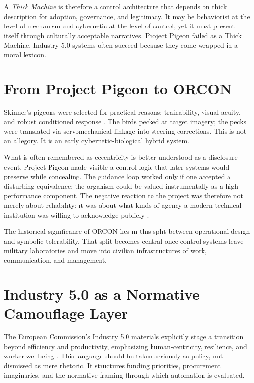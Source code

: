 \documentclass[runningheads]{llncs}
\begin{document}
A \emph{Thick Machine} is therefore a control architecture that depends on thick description for adoption, governance, and legitimacy. It may be behaviorist at the level of mechanism and cybernetic at the level of control, yet it must present itself through culturally acceptable narratives. Project Pigeon failed as a Thick Machine. Industry 5.0 systems often succeed because they come wrapped in a moral lexicon.

\section{From Project Pigeon to ORCON}

Skinner's pigeons were selected for practical reasons: trainability, visual acuity, and robust conditioned response \cite{skinner1960pigeons}. The birds pecked at target imagery; the pecks were translated via servomechanical linkage into steering corrections. This is not an allegory. It is an early cybernetic-biological hybrid system.

What is often remembered as eccentricity is better understood as a disclosure event. Project Pigeon made visible a control logic that later systems would preserve while concealing. The guidance loop worked only if one accepted a disturbing equivalence: the organism could be valued instrumentally as a high-performance component. The negative reaction to the project was therefore not merely about reliability; it was about what kinds of agency a modern technical institution was willing to acknowledge publicly \cite{capshew1993engineering,schultzfigueroa2019project,wlodarczyk2020beyond}.

The historical significance of ORCON lies in this split between operational design and symbolic tolerability. That split becomes central once control systems leave military laboratories and move into civilian infrastructures of work, communication, and management.

\section{Industry 5.0 as a Normative Camouflage Layer}

The European Commission's Industry 5.0 materials explicitly stage a transition beyond efficiency and productivity, emphasizing human-centricity, resilience, and worker wellbeing \cite{breque2021industry}. This language should be taken seriously as policy, not dismissed as mere rhetoric. It structures funding priorities, procurement imaginaries, and the normative framing through which automation is evaluated.
\end{document}
